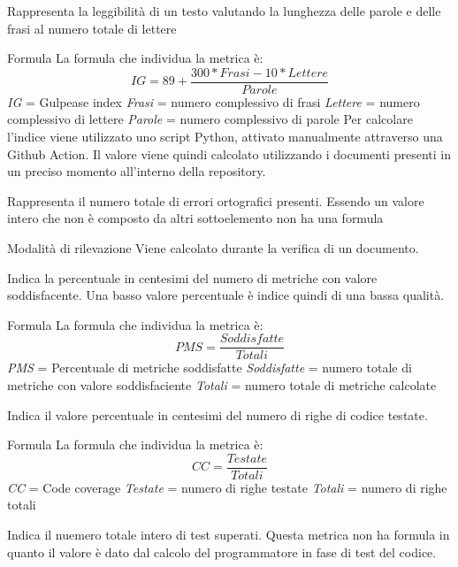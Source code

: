 Rappresenta la leggibilità di un testo valutando la lunghezza delle parole e delle frasi al numero totale di lettere
\par{Formula}
La formula che individua la metrica è:
\begin{displaymath}
\textit{IG} = 89 + \frac{300 * \textit{Frasi} - 10* \textit{Lettere}}{\textit{Parole}}
\end{displaymath}
\textit{IG} = Gulpease index
\textit{Frasi} = numero complessivo di frasi
\textit{Lettere} = numero complessivo di lettere
\textit{Parole} = numero complessivo di parole
\mysubparagraph{}Per calcolare l'indice viene utilizzato uno script Python, attivato manualmente attraverso una Github Action. Il valore viene quindi calcolato utilizzando i documenti presenti in un preciso momento all'interno della repository.

Rappresenta il numero totale di errori ortografici presenti. Essendo un valore intero che non è composto da altri sottoelemento non ha una formula
\par{Modalità di rilevazione}
Viene calcolato durante la verifica di un documento.


Indica la percentuale in centesimi del numero di metriche con valore soddisfacente. Una basso valore percentuale è indice quindi di una bassa qualità.
\par{Formula}
La formula che individua la metrica è:
\begin{displaymath}
  \textit{PMS} = \frac{\textit{Soddisfatte}}{\textit{Totali}}
\end{displaymath}
  \textit{PMS} = Percentuale di metriche soddisfatte
  \textit{Soddisfatte} = numero totale di metriche con valore soddisfaciente
  \textit{Totali} = numero totale di metriche calcolate



Indica il valore percentuale in centesimi del numero di righe di codice testate.
\par{Formula}
La formula che individua la metrica è:
\begin{displaymath}
  \textit{CC} = \frac{\textit{Testate}}{\textit{Totali}}
\end{displaymath}
 \textit{CC} = Code coverage
 \textit{Testate} = numero di righe testate
 \textit{Totali} = numero di righe totali


Indica il nuemero totale intero di test superati. Questa metrica non ha formula in quanto il valore è dato dal calcolo del programmatore in fase di test del codice.
